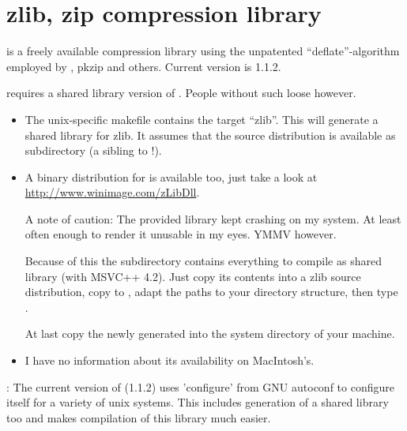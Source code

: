 \documentclass {report}
\begin{document}
\chapter {zlib, zip compression library}\label{zlib}

\zlib{} is a freely available compression library using the
unpatented ``deflate''-algorithm employed by , \cmd
{pkzip} and others. Current version is 1.1.2.

\trf{} requires a shared library version of \zlib. People
without such  loose however.

\begin {itemize}
\item	The unix-specific makefile contains the target ``zlib''. This
	will generate a shared library for zlib. It assumes that the
	 source distribution is available as subdirectory
	 (a sibling to  !).

\item	A binary distribution for \win{} is available too, just take a
	look at
	\url{http://www.winimage.com/zLibDll}. 

	A note of caution: The provided library kept crashing on my
	\winnt{} system. At least often enough to render it unusable in
	my eyes. YMMV however.

	Because of this the subdirectory  contains
	everything to compile \zlib{} as shared library (with MSVC++
	4.2). Just copy its contents into a zlib source distribution,
	copy  to , adapt the paths
	to your directory structure, then type .

	At last copy the newly generated  into the
	system directory of your machine.

\item	I have no information about its availability on MacIntosh's.
\end   {itemize}


: The current version of \zlib (1.1.2) uses
'configure' from GNU autoconf to configure itself for a variety of
unix systems. This includes generation of a shared library too and
makes compilation of this library much easier.
\end{document}
